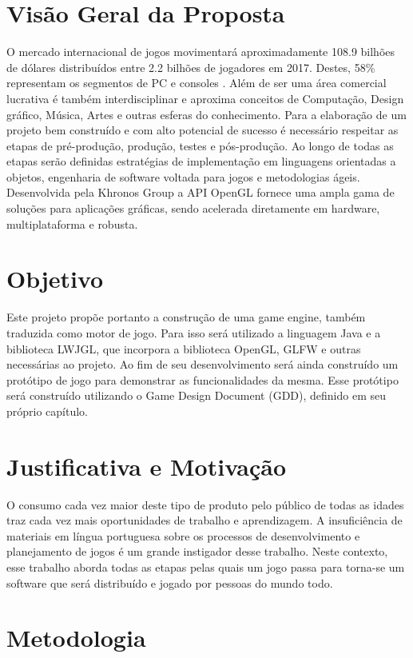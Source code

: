 \documentclass[12pt, 
openright, 
oneside, 
a4paper,    
brazil]{facom-ufu-abntex2}
\begin{document}
\section{Visão Geral da Proposta}
O mercado internacional de jogos movimentará aproximadamente 108.9
bilhões de dólares distribuídos entre 2.2 bilhões de jogadores em 2017. Destes, 58\%
representam os segmentos de PC e consoles \cite{GameMarketArticle}. Além de ser uma área
comercial lucrativa é também interdisciplinar e aproxima
conceitos de Computação, Design gráfico, Música, Artes e outras esferas do
conhecimento.
Para a elaboração de um projeto bem construído e com alto potencial de
sucesso é necessário respeitar as etapas de pré-produção, produção, testes
e pós-produção. Ao longo de todas as etapas serão definidas estratégias de
implementação em linguagens orientadas a objetos, engenharia de software
voltada para jogos e metodologias ágeis.
Desenvolvida pela Khronos Group a API OpenGL fornece uma ampla gama de soluções para aplicações gráficas, sendo acelerada diretamente em
hardware, multiplataforma e robusta.

\section{Objetivo}
Este projeto propõe portanto a construção de uma game engine, também traduzida como motor de jogo. Para isso será utilizado a linguagem Java e a biblioteca LWJGL, que incorpora a biblioteca OpenGL, GLFW e outras necessárias ao projeto. Ao fim de seu desenvolvimento será ainda construído um protótipo de jogo para demonstrar as funcionalidades da mesma. Esse protótipo será construído utilizando o Game Design Document (GDD), definido em seu próprio capítulo.

\section{Justificativa e Motivação}
O consumo cada vez maior deste tipo de produto pelo público de todas as idades traz cada vez mais oportunidades de trabalho e aprendizagem.
A insuficiência de materiais em língua portuguesa sobre os processos de desenvolvimento e planejamento de jogos é um grande instigador desse trabalho. Neste contexto, esse trabalho aborda todas as etapas pelas quais um jogo passa para torna-se um software que será distribuído e jogado por pessoas do mundo todo.


\section{Metodologia}
\end{document}
